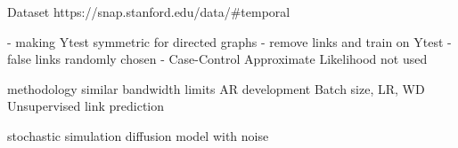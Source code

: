 Dataset https://snap.stanford.edu/data/#temporal

- making Ytest symmetric for directed graphs
- remove links and train on Ytest
- false links randomly chosen
- Case-Control Approximate Likelihood not used

methodology similar
bandwidth limits
AR development
Batch size, LR, WD
Unsupervised link prediction

stochastic simulation
diffusion model with noise